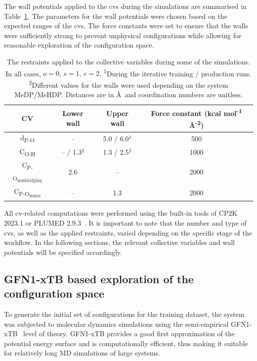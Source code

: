 The wall potentials applied to the \acp{cv} during the simulations are summarised in Table~\ref{tab:wall_potentials}. The parameters for the wall potentials were chosen based on the expected ranges of the \acp{cv}. The force constants were set to ensure that the walls were sufficiently strong to prevent unphysical configurations while allowing for reasonable exploration of the configuration space.

\begin{table}[b!]
    \centering
    \caption{The restraints applied to the collective variables during some of the simulations. In all cases, $o = 0$, $s = 1$, $e = 2$. \textsuperscript{1}During the iterative training / production runs. \textsuperscript{2}Different values for the walls were used depending on the system MeDP/MeHDP. Distances are in \AA\ and coordination numbers are unitless.}
    \label{tab:wall_potentials}
    \begin{tabular}{cccc}
    \toprule
    \textbf{CV} & \textbf{Lower wall} & \textbf{Upper wall} & \textbf{Force constant (kcal mol\textsuperscript{-1} \AA\textsuperscript{-2})} \\
    \midrule
    d\textsubscript{P-O} & -- & 5.0 / 6.0$^{1}$ & 500  \\
    C\textsubscript{O-H} & -- / 1.3$^{2}$ & 1.3 / 2.5$^{2}$ & 1000 \\
    C\textsubscript{P-O\textsubscript{nonbridging}} & 2.6 & -- & 2000 \\
    C\textsubscript{P-O\textsubscript{water}} & -- & 1.3 & 2000 \\
    \bottomrule
    \end{tabular}
\end{table}

All \ac{cv}-related computations were performed using the built-in tools of CP2K 2023.1 \citep{kuhneCP2KElectronicStructure2020} or PLUMED 2.9.3~\citep{tribelloPLUMED2New2014}. It is important to note that the number and type of \acp{cv}, as well as the applied restraints, varied depending on the specific stage of the workflow. In the following sections, the relevant collective variables and wall potentials will be specified accordingly.



\subsection{GFN1-xTB based exploration of the configuration space}
\label{subsec:xtb-exploration-of-configuration-space}
To generate the initial set of configurations for the training dataset, the system was subjected to molecular dynamics simulations using the semi-empirical GFN1-xTB~\citep{grimmeRobustAccurateTightBinding2017} level of theory. GFN1-xTB provides a good first approximation of the potential energy surface and is computationally efficient, thus making it suitable for relatively long MD simulations of large systems. 

